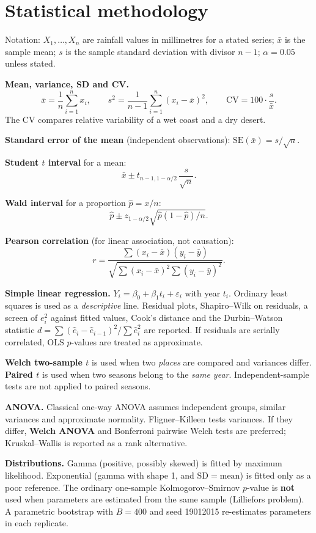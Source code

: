 \documentclass[
]{article}
\begin{document}
\section{Statistical methodology}\label{statistical-methodology}

Notation: \(X_1,\ldots,X_n\) are rainfall values in millimetres for a
stated series; \(\bar x\) is the sample mean; \(s\) is the sample
standard deviation with divisor \(n-1\); \(\alpha = 0.05\) unless
stated.

\textbf{Mean, variance, SD and CV.} \[
\bar x = \frac{1}{n}\sum_{i=1}^n x_i,\qquad
s^2 = \frac{1}{n-1}\sum_{i=1}^n (x_i-\bar x)^2,\qquad
\mathrm{CV} = 100\cdot\frac{s}{\bar x}.
\] The CV compares relative variability of a wet coast and a dry desert.

\textbf{Standard error of the mean} (independent observations):
\(\mathrm{SE}(\bar x)=s/\sqrt{n}\).

\textbf{Student \(t\) interval} for a mean: \[
\bar x \pm t_{n-1,1-\alpha/2}\,\frac{s}{\sqrt{n}}.
\]

\textbf{Wald interval} for a proportion \(\hat p = x/n\): \[
\hat p \pm z_{1-\alpha/2}\sqrt{\hat p(1-\hat p)/n}.
\]

\textbf{Pearson correlation} (for linear association, not causation): \[
r = \frac{\sum (x_i-\bar x)(y_i-\bar y)}{\sqrt{\sum(x_i-\bar x)^2\sum(y_i-\bar y)^2}}.
\]

\textbf{Simple linear regression.}
\(Y_i = \beta_0 + \beta_1 t_i + \varepsilon_i\) with year \(t_i\).
Ordinary least squares is used as a \emph{descriptive} line. Residual
plots, Shapiro--Wilk on residuals, a screen of \(e_i^2\) against fitted
values, Cook's distance and the Durbin--Watson statistic
\(d=\sum(\hat e_i-\hat e_{i-1})^2/\sum\hat e_i^2\) are reported. If
residuals are serially correlated, OLS \(p\)-values are treated as
approximate.

\textbf{Welch two-sample \(t\)} is used when two \emph{places} are
compared and variances differ. \textbf{Paired \(t\)} is used when two
seasons belong to the \emph{same year}. Independent-sample tests are not
applied to paired seasons.

\textbf{ANOVA.} Classical one-way ANOVA assumes independent groups,
similar variances and approximate normality. Fligner--Killeen tests
variances. If they differ, \textbf{Welch ANOVA} and Bonferroni pairwise
Welch tests are preferred; Kruskal--Wallis is reported as a rank
alternative.

\textbf{Distributions.} Gamma (positive, possibly skewed) is fitted by
maximum likelihood. Exponential (gamma with shape 1, and
\(\mathrm{SD}=\mathrm{mean}\)) is fitted only as a poor reference. The
ordinary one-sample Kolmogorov--Smirnov \(p\)-value is \textbf{not} used
when parameters are estimated from the same sample (Lilliefors problem).
A parametric bootstrap with \(B=400\) and seed 19012015 re-estimates
parameters in each replicate.
\end{document}

